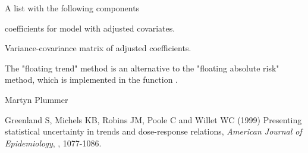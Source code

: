\begin{Value}
A list with the following components
\begin{ldescription}
\item[\code{coef}] coefficients for model with adjusted covariates.
\item[\code{vcov}] Variance-covariance matrix of adjusted coefficients.
\end{ldescription}
\end{Value}
\begin{Note}\relax
The "floating trend" method is an alternative to the "floating
absolute risk" method, which is implemented in the function
.
\end{Note}
\begin{Author}\relax
Martyn Plummer
\end{Author}
\begin{References}\relax
Greenland S, Michels KB, Robins JM, Poole C and Willet WC (1999)
Presenting statistical uncertainty in trends and dose-response relations,
\emph{American Journal of Epidemiology}, , 1077-1086.
\end{References}
\begin{SeeAlso}\relax
{}
\end{SeeAlso}


